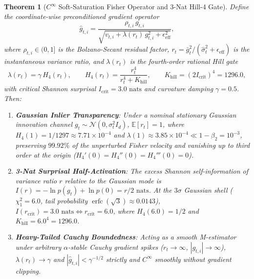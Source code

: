 \documentclass[10pt,twocolumn,letterpaper]{article}
\newtheorem{theorem}{Theorem}[section]
\theoremstyle{definition}
\theoremstyle{remark}
\newcommand{\E}{\mathbb{E}}
\newcommand{\erfc}{\operatorname{erfc}}
\newcommand{\epseff}{\epsilon_{\mathrm{eff}}}
\begin{document}
\begin{theorem}[$C^\infty$ Soft-Saturation Fisher Operator and 3-Nat Hill-4 Gate]
\label{thm:fisher_hill}
Define the coordinate-wise preconditioned gradient operator
\begin{equation}
  \hat{g}_{t,i} = \frac{\rho_{t,i}\, g_{t,i}}{\sqrt{v_{t,i} + \lambda(r_t)\, g_{t,i}^2 + \epseff^2}},
  \label{eq:soft_sat_fisher}
\end{equation}
where $\rho_{t,i} \in (0, 1]$ is the Bolzano-Secant residual factor, $r_t = \bar{g}_t^2 / (\hat{\sigma}_t^2 + \epseff)$ is the instantaneous variance ratio, and $\lambda(r_t)$ is the fourth-order rational Hill gate
\begin{equation}
  \lambda(r_t) = \gamma\, H_4(r_t), \qquad H_4(r_t) = \frac{r_t^4}{r_t^4 + K_{\mathrm{hill}}}, \qquad K_{\mathrm{hill}} = (2 I_{\mathrm{crit}})^4 = 1296.0,
  \label{eq:hill_gate}
\end{equation}
with critical Shannon surprisal $I_{\mathrm{crit}} = 3.0\text{ nats}$ and curvature damping $\gamma = 0.5$. Then:
\begin{enumerate}[leftmargin=*,nosep,label=(\roman*)]
  \item \textbf{Gaussian Inlier Transparency}: Under a nominal stationary Gaussian innovation channel $g_t \sim \mathcal{N}(0, \sigma_t^2 I_d)$, $\E[r_t] = 1$, where $H_4(1) = 1/1297 \approx 7.71 \times 10^{-4}$ and $\lambda(1) \approx 3.85 \times 10^{-4} \ll 1 - \beta_2 = 10^{-3}$, preserving $99.92\%$ of the unperturbed Fisher velocity and vanishing up to third order at the origin ($H_4'(0)=H_4''(0)=H_4'''(0)=0$).
  \item \textbf{3-Nat Surprisal Half-Activation}: The excess Shannon self-information of variance ratio $r$ relative to the Gaussian mode is $I(r) = -\ln p(g_t) + \ln p(0) = r/2\text{ nats}$. At the $3\sigma$ Gaussian shell ($\chi_1^2 = 6.0$, tail probability $\erfc(\sqrt{3}) \approx 0.0143$), $I(r_{\mathrm{crit}}) = 3.0\text{ nats} \iff r_{\mathrm{crit}} = 6.0$, where $H_4(6.0) = 1/2$ and $K_{\mathrm{hill}} = 6.0^4 = 1296.0$.
  \item \textbf{Heavy-Tailed Cauchy Boundedness}: Acting as a smooth M-estimator~\cite{huber1964robust} under arbitrary $\alpha$-stable Cauchy gradient spikes ($r_t \to \infty$, $|g_{t,i}| \to \infty$), $\lambda(r_t) \to \gamma$ and $|\hat{g}_{t,i}| < \gamma^{-1/2}$ strictly and $C^\infty$ smoothly without gradient clipping.
\end{enumerate}
\end{theorem}
\end{document}
